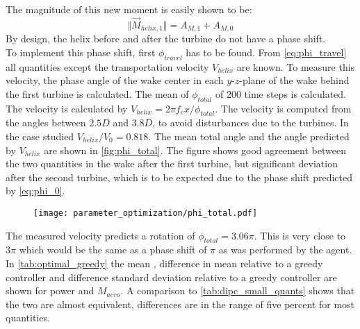 The magnitude of this new moment is easily shown to be:
\begin{equation}
 \Vert\vec{M}_{helix,1}\Vert =  A_{M,1} + A_{M,0}
\end{equation}
By design, the helix before and after the turbine do not have a phase shift. \\
To implement this phase shift, first $\phi_{travel}$ has to be found. From \eqref{eq:phi_travel} all quantities except the transportation velocity $V_{helix}$ are known. To measure this velocity, the phase angle of the wake center in each $y$-$z$-plane of the wake behind the first turbine is calculated. The mean of $\phi_{total}$ of 200 time steps is calculated. The velocity is calculated by $V_{helix} = 2\pi f_e x/\phi_{total}$. The velocity is computed from the angles between $2.5D$ and $3.8D$, to avoid disturbances due to the turbines. In the case studied $V_{helix}/V_0 = 0.818$. The mean total angle and the angle predicted by $V_{helix}$ are shown in \autoref{fig:phi_total}. The figure shows good agreement between the two quantities in the wake after the first turbine, but significant deviation after the second turbine, which is to be expected due to the phase shift predicted by \eqref{eq:phi_0}.
\begin{figure}[h]
	\centering
	\texttt{[image: parameter\_optimization/phi\_total.pdf]}
	\caption{}
	\label{fig:phi_total}
\end{figure}
The measured velocity predicts a rotation of $\phi_{total}=3.06\pi$. This is very close to $3\pi$ which would be the same as a phase shift of $\pi$ as was performed by the agent. In \autoref{tab:optimal_greedy} the mean , difference in mean relative to a greedy controller and difference standard deviation relative to a greedy controller are shown for power and $M_{aero}$. A comparison to \autoref{tab:dipc_small_quants} shows that the two are almost equivalent, differences are in the range of five percent for most quantities.
